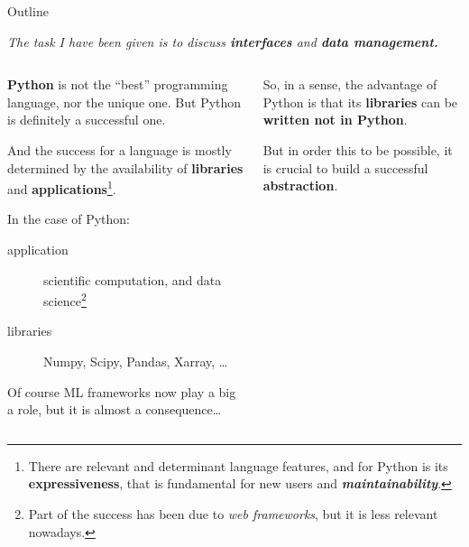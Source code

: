 \documentclass[9pt]{beamer}
\begin{document}
\begin{frame}{Outline}
    \vspace*{10pt}
    \begin{center}
        \itshape
        The task I have been given is to discuss \textbf{interfaces} and
        \textbf{data management.}
    \end{center}
    \vspace*{10pt}

    \begin{columns}
        \begin{column}{0.5\textwidth}
            \alert{\textbf{Python}} is not the \enquote{best} programming
            language, nor the unique one.
            But Python is definitely a successful one.
            \vspace*{10pt}

            And the success for a language is mostly determined by the
            availability of \textbf{libraries} and
            \textbf{applications}\footnote{
                There are relevant and determinant language features, and for
                Python is its \textbf{expressiveness}, that is fundamental for
                new users and \textit{\textbf{maintainability}}.
            }.\newline

            In the case of Python:
            \begin{description}
                \item[application] scientific computation, and data science\footnote{
                    Part of the success has been due to \textit{web
                    frameworks}, but it is less relevant nowadays.
                }
                \item[libraries] Numpy, Scipy, Pandas, Xarray, \dots
            \end{description}
            \vspace*{30pt}

            Of course ML frameworks now play a big a role, but it is almost a
            consequence\dots
            \vspace*{5pt}
        \end{column}
        \begin{column}{0.5\textwidth}
            So, in a sense, the advantage of Python is that its
            \alert{\textbf{libraries}} can be \alert{\textbf{written not in
            Python}}.

            But in order this to be possible, it is crucial to build a
            successful \textbf{abstraction}.
            \vspace*{20pt}


\end{column}
\end{columns}
\end{frame}
\end{document}

